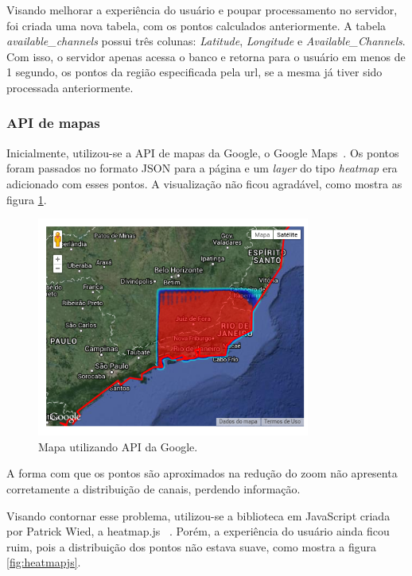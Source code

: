 Visando melhorar a experiência do usuário e poupar processamento no servidor, foi criada uma nova tabela, com os pontos calculados anteriormente. A tabela \textit{available\_channels} possui três colunas: \textit{Latitude}, \textit{Longitude} e \textit{Available\_Channels}. Com isso, o servidor apenas acessa o banco e retorna para o usuário em menos de 1 segundo, os pontos da região especificada pela url, se a mesma já tiver sido processada anteriormente.

\subsubsection{API de mapas}

Inicialmente, utilizou-se a API de mapas da Google, o Google Maps~\cite{googlemaps}. Os pontos foram passados no formato JSON para a página e um \textit{layer} do tipo \textit{heatmap} era adicionado com esses pontos. A visualização não ficou agradável, como mostra as figura \ref{fig:gmaps}.

\begin{figure}[htb]
\centering
\includegraphics[width=0.8\textwidth]{figs/gmaps}
\caption[Mapa utilizando API da Google.]
{Mapa utilizando API da Google.}
\label{fig:gmaps}
\end{figure} 

A forma com que os pontos são aproximados na redução do zoom não apresenta corretamente a distribuição de canais, perdendo informação.

Visando contornar esse problema, utilizou-se a biblioteca em JavaScript criada por Patrick Wied, a heatmap.js ~\cite{heatmapjs}. Porém, a experiência do usuário ainda ficou ruim, pois a distribuição dos pontos não estava suave, como mostra a figura \ref{fig:heatmapjs}.

